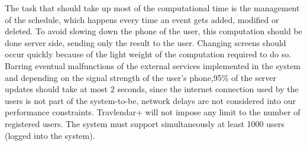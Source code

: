 The task that should take up most of the computational time is the management of the schedule, which happens every time an event gets added, modified or deleted. To avoid slowing down the phone of the user, this computation should be done server side, sending only the result to the user.
\newline
Changing screens should occur quickly because of the light weight of the computation required to do so.
\newline
Barring eventual malfunctions of the external services implemented in the system and depending on the signal strength of the user's phone,95\% of the server updates should take at most 2 seconds, since the internet connection used by the users is not part of the system-to-be, network delays are not considered into our performance constraints.
Travlendar+ will not impose any limit to the number of registered users.
The system must support simultaneously at least 1000 users (logged into the system).